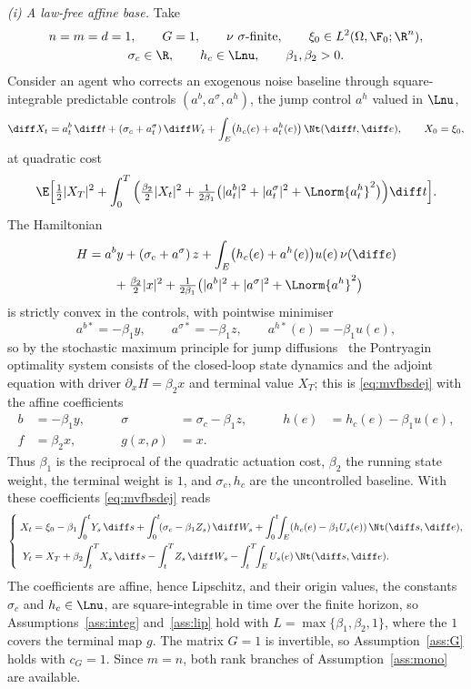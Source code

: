 \begin{example}\label{ex:concrete}\leavevmode\par\nopagebreak
\emph{(i) A law-free affine base.} Take
\[
\begin{gathered}
n=m=d=1,\qquad G=1,\qquad \nu\ \sigma\text{-finite},\qquad
\xi_0\in L^2(\Omega,\F_0;\R^n),\\
\sigma_c\in\R,\qquad h_c\in\Lnu,\qquad \beta_1,\beta_2>0 .
\end{gathered}
\]
Consider an agent who corrects an exogenous noise baseline through square-integrable
predictable controls $(a^b,a^\sigma,a^h)$, the jump control $a^h$ valued in $\Lnu$,
\[
\diff X_t=a^b_t\,\diff t+(\sigma_c+a^\sigma_t)\,\diff W_t
+\int_E\bigl(h_c(e)+a^h_t(e)\bigr)\,\Nt(\diff t,\diff e),\qquad X_0=\xi_0,
\]
at quadratic cost
\[
\E\Big[\tfrac12|X_T|^2+\int_0^T\Big(\tfrac{\beta_2}2|X_t|^2
+\tfrac1{2\beta_1}\bigl(|a^b_t|^2+|a^\sigma_t|^2+\Lnorm{a^h_t}^2\bigr)\Big)\diff t\Big].
\]
The Hamiltonian
\[
\begin{aligned}
H&=a^b y+(\sigma_c+a^\sigma)\,z+\int_E\bigl(h_c(e)+a^h(e)\bigr)u(e)\,\nu(\diff e)\\
&\qquad+\tfrac{\beta_2}2|x|^2+\tfrac1{2\beta_1}\bigl(|a^b|^2+|a^\sigma|^2+\Lnorm{a^h}^2\bigr)
\end{aligned}
\]
is strictly convex in the controls, with pointwise minimiser
\[
a^{b*}=-\beta_1 y,\qquad a^{\sigma*}=-\beta_1 z,\qquad a^{h*}(e)=-\beta_1 u(e),
\]
so by the stochastic maximum principle for jump diffusions~\cite{TangLi} the Pontryagin
optimality system consists of the closed-loop state dynamics and the adjoint equation
with driver $\partial_xH=\beta_2x$ and terminal value $X_T$; this is
\eqref{eq:mvfbsdej} with the affine coefficients
\[
\begin{aligned}
b&=-\beta_1 y, &\qquad \sigma&=\sigma_c-\beta_1 z, &\qquad h(e)&=h_c(e)-\beta_1 u(e),\\
f&=\beta_2 x, &\qquad g(x,\rho)&=x .
\end{aligned}
\]
Thus $\beta_1$ is the reciprocal of the quadratic actuation cost, $\beta_2$ the running
state weight, the terminal weight is $1$, and $\sigma_c,h_c$ are the uncontrolled baseline.
With these coefficients \eqref{eq:mvfbsdej} reads
\[
\left\{\;\begin{aligned}
X_t&=\xi_0-\beta_1\!\int_0^t\! Y_s\,\diff s+\int_0^t\!(\sigma_c-\beta_1 Z_s)\,\diff W_s
+\int_0^t\!\!\int_E(h_c(e)-\beta_1 U_s(e))\,\Nt(\diff s,\diff e),\\
Y_t&=X_T+\beta_2\!\int_t^T\! X_s\,\diff s-\int_t^T\! Z_s\,\diff W_s
-\int_t^T\!\!\int_E U_s(e)\,\Nt(\diff s,\diff e).
\end{aligned}\right.
\]
The coefficients are affine, hence Lipschitz, and their origin values, the constants
$\sigma_c$ and $h_c\in\Lnu$, are square-integrable in time over the finite horizon, so
Assumptions~\ref{ass:integ} and~\ref{ass:lip} hold with
$L=\max\{\beta_1,\beta_2,1\}$, where the $1$ covers the terminal map $g$. The matrix $G=1$ is
invertible, so Assumption~\ref{ass:G} holds with $c_G=1$. Since $m=n$,
both rank branches of Assumption~\ref{ass:mono} are available.


\end{example}
